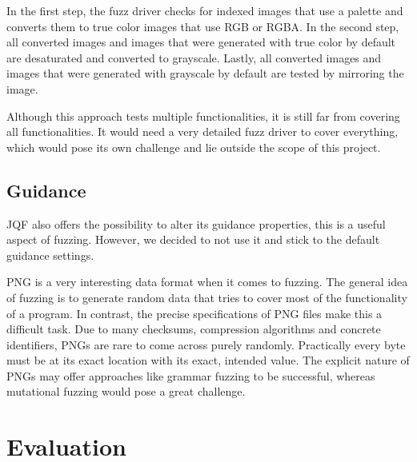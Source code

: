 \documentclass[runningheads]{llncs}
\begin{document}
In the first step, the fuzz driver checks for indexed images that use a palette and converts them to true color images that use RGB or RGBA. 
In the second step, all converted images and images that were generated with true color by default are desaturated and converted to grayscale.
Lastly, all converted images and images that were generated with grayscale by default are tested by mirroring the image.

Although this approach tests multiple functionalities, it is still far from covering all functionalities.
It would need a very detailed fuzz driver to cover everything, which would pose its own challenge and lie outside the scope of this project.

\subsection{Guidance}
JQF also offers the possibility to alter its guidance properties, this is a useful aspect of fuzzing. However, we decided to not use it and stick to the default guidance settings.

PNG is a very interesting data format when it comes to fuzzing. The general idea of fuzzing is to generate random data that tries to cover most of the functionality of a program.
In contrast, the precise specifications of PNG files make this a difficult task. 
Due to many checksums, compression algorithms and concrete identifiers, PNGs are rare to come across purely randomly.
Practically every byte must be at its exact location with its exact, intended value.
The explicit nature of PNGs may offer approaches like grammar fuzzing to be successful, whereas mutational fuzzing would pose a great challenge.

\section{Evaluation}

\end{document}
